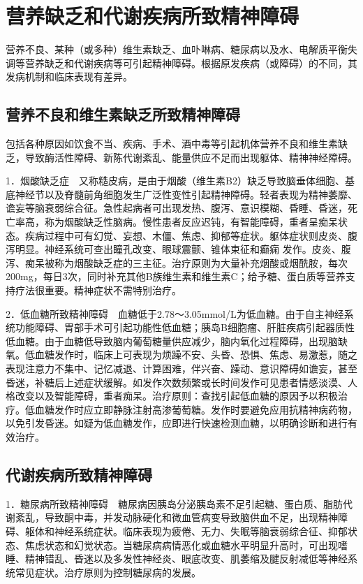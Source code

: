 \section{营养缺乏和代谢疾病所致精神障碍}

营养不良、某种（或多种）维生素缺乏、血卟啉病、糖尿病以及水、电解质平衡失调等营养缺乏和代谢疾病等可引起精神障碍。根据原发疾病（或障碍）的不同，其发病机制和临床表现有差异。

\subsection{营养不良和维生素缺乏所致精神障碍}

包括各种原因如饮食不当、疾病、手术、酒中毒等引起机体营养不良和维生素缺乏，导致酶活性障碍、新陈代谢紊乱、能量供应不足而出现躯体、精神神经障碍。

1．烟酸缺乏症　又称糙皮病，是由于烟酸（维生素B2）缺乏导致脑垂体细胞、基底神经节以及脊髓前角细胞发生广泛性变性引起精神障碍。轻者表现为精神萎靡、谵妄等脑衰弱综合征。急性起病者可出现发热、腹泻、意识模糊、昏睡、昏迷，死亡率高，称为烟酸缺乏性脑病。慢性患者反应迟钝，有智能障碍，重者呈痴呆状态。疾病过程中可有幻觉、妄想、木僵、焦虑、抑郁等症状。躯体症状则皮炎、腹泻明显。神经系统可查出瞳孔改变、眼球震颤、锥体束征和癫痫
发作。皮炎、腹泻、痴呆被称为烟酸缺乏症的三主征。治疗原则为大量补充烟酸或烟酰胺，每次200mg，每日3次，同时补充其他B族维生素和维生素C；给予糖、蛋白质等营养支持疗法很重要。精神症状不需特别治疗。

2．低血糖所致精神障碍　血糖低于2.78～3.05mmol/L为低血糖。由于自主神经系统功能障碍、胃部手术可引起功能性低血糖；胰岛B细胞瘤、肝脏疾病引起器质性低血糖。由于血糖低导致脑内葡萄糖量供应减少，脑内氧化过程障碍，出现脑缺氧。低血糖发作时，临床上可表现为烦躁不安、头昏、恐惧、焦虑、易激惹，随之表现注意力不集中、记忆减退、计算困难，伴兴奋、躁动、意识障碍如谵妄，甚至昏迷，补糖后上述症状缓解。如发作次数频繁或长时间发作可见患者情感淡漠、人格改变以及智能障碍，重者痴呆。治疗原则：查找引起低血糖的原因予以积极治疗。低血糖发作时应立即静脉注射高渗葡萄糖。发作时要避免应用抗精神病药物，以免引发昏迷。如疑为低血糖发作，应即进行快速检测血糖，以明确诊断和进行有效治疗。

\subsection{代谢疾病所致精神障碍}

1．糖尿病所致精神障碍　糖尿病因胰岛分泌胰岛素不足引起糖、蛋白质、脂肪代谢紊乱，导致酮中毒，并发动脉硬化和微血管病变导致脑供血不足，出现精神障碍、躯体和神经系统症状。临床表现为疲倦、无力、失眠等脑衰弱综合征、抑郁状态、焦虑状态和幻觉状态。当糖尿病病情恶化或血糖水平明显升高时，可出现嗜睡、精神错乱、昏迷以及多发性神经炎、眼底改变、肌萎缩及腱反射减低等神经系统常见症状。治疗原则为控制糖尿病的发展。

